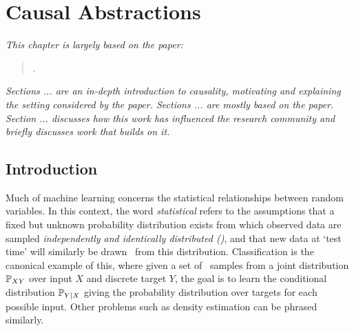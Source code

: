 \chapter{Causal Abstractions}

\ifpdf
    \graphicspath{{Chapter3/Figs/Raster/}{Chapter3/Figs/PDF/}{Chapter3/Figs/}}
\else
    \graphicspath{{Chapter3/Figs/Vector/}{Chapter3/Figs/}}
\fi

\emph{This chapter is largely based on the paper:}


\begin{quote}
.
\end{quote}


\emph{Sections ... are an in-depth introduction to causality, motivating and explaining the setting considered by the paper.
Sections ... are mostly based on the paper. 
Section ... discusses how this work has influenced the research community and briefly discusses work that builds on it.}



\section{Introduction}

Much of machine learning concerns the statistical relationships between random variables. In this context, the word \emph{statistical} refers to the assumptions that a fixed but unknown probability distribution exists from which observed data are sampled \emph{independently and identically distributed (\iid)}, and that new data at `test time' will similarly be drawn \iid~from this distribution.
Classification is the canonical example of this, where given a set of \iid~samples from a joint distribution $\mathbb{P}_{XY}$ over input $X$ and discrete target $Y$, the goal is to learn the conditional distribution $\mathbb{P}_{Y|X}$ giving the probability distribution over targets for each possible input. Other problems such as density estimation can be phrased similarly.

